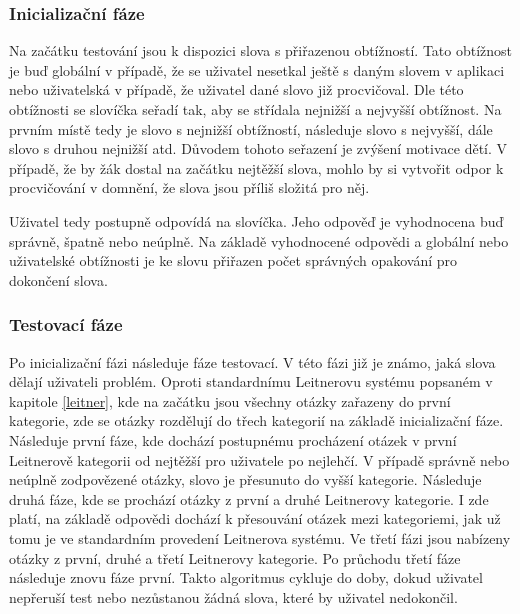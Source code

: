 \documentclass[a4paper,11pt,titlepage,fleqn]{article}
\begin{document}
        \subsubsection{Inicializační fáze}
            \label{init-faze}
            Na začátku testování jsou k dispozici slova s přiřazenou obtížností. Tato obtížnost je buď globální v případě, že se uživatel nesetkal ještě s daným slovem v aplikaci nebo uživatelská v případě, že uživatel dané slovo již procvičoval. Dle této obtížnosti se slovíčka seřadí tak, aby se střídala nejnižší a nejvyšší obtížnost. Na prvním místě tedy je slovo s nejnižší obtížností, následuje slovo s nejvyšší, dále slovo s druhou nejnižší atd. Důvodem tohoto seřazení je zvýšení motivace dětí. V případě, že by žák dostal na začátku nejtěžší slova, mohlo by si vytvořit odpor k procvičování v domnění, že slova jsou příliš složitá pro něj. 

            Uživatel tedy postupně odpovídá na slovíčka. Jeho odpověď je vyhodnocena buď správně, špatně nebo neúplně. Na základě vyhodnocené odpovědi a globální nebo uživatelské obtížnosti je ke slovu přiřazen počet správných opakování pro dokončení slova.

        \subsubsection{Testovací fáze}
            Po inicializační fázi následuje fáze testovací. V této fázi již je známo, jaká slova dělají uživateli problém. Oproti standardnímu Leitnerovu systému popsaném v kapitole \ref{leitner}, kde na začátku jsou všechny otázky zařazeny do první kategorie, zde se otázky rozdělují do třech kategorií na základě inicializační fáze. Následuje první fáze, kde dochází postupnému procházení otázek v první Leitnerově kategorii od nejtěžší pro uživatele po nejlehčí. V případě správně nebo neúplně zodpovězené otázky, slovo je přesunuto do vyšší kategorie. Následuje druhá fáze, kde se prochází otázky z první a druhé Leitnerovy kategorie. I zde platí, na základě odpovědi dochází k přesouvání otázek mezi kategoriemi, jak už tomu je ve standardním provedení Leitnerova systému. Ve třetí fázi jsou nabízeny otázky z první, druhé a třetí Leitnerovy kategorie. Po průchodu třetí fáze následuje znovu fáze první. Takto algoritmus cykluje do doby, dokud uživatel nepřeruší test nebo nezůstanou žádná slova, které by uživatel nedokončil. 
\end{document}
